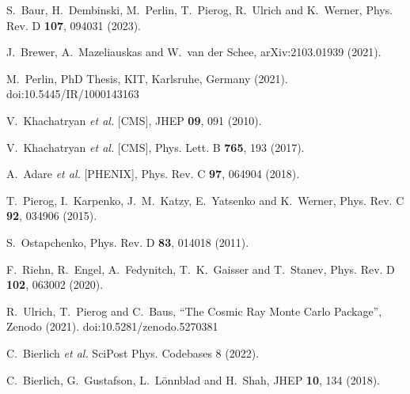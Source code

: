 \documentclass[aps,twocolumn,nofootinbib]{revtex4-1}
\begin{document}
\begin{thebibliography}{}
S.~Baur, H.~Dembinski, M.~Perlin, T.~Pierog, R.~Ulrich and K.~Werner,
Phys. Rev. D \textbf{107}, 094031 (2023).

J.~Brewer, A.~Mazeliauskas and W.~van der Schee,
arXiv:2103.01939 (2021).

M.~Perlin, PhD Thesis, KIT, Karlsruhe, Germany (2021).
doi:10.5445/IR/1000143163

V.~Khachatryan \textit{et al.} [CMS],
JHEP \textbf{09}, 091 (2010).

V.~Khachatryan \textit{et al.} [CMS],
Phys. Lett. B \textbf{765}, 193 (2017).

A.~Adare \textit{et al.} [PHENIX],
Phys. Rev. C \textbf{97}, 064904 (2018).

T.~Pierog, I.~Karpenko, J.~M.~Katzy, E.~Yatsenko and K.~Werner,
Phys. Rev. C \textbf{92}, 034906 (2015).

S.~Ostapchenko,
Phys. Rev. D \textbf{83}, 014018 (2011).

F.~Riehn, R.~Engel, A.~Fedynitch, T.~K.~Gaisser and T.~Stanev,
Phys. Rev. D \textbf{102}, 063002 (2020).

R.~Ulrich, T.~Pierog and C.~Baus, 
``The Cosmic Ray Monte Carlo Package'', 
Zenodo (2021).
doi:10.5281/zenodo.5270381

C.~Bierlich \textit{et al.}
SciPost Phys. Codebases 8 (2022).

C.~Bierlich, G.~Gustafson, L.~L\"onnblad and H.~Shah,
JHEP \textbf{10}, 134 (2018).


\end{thebibliography}
\end{document}
